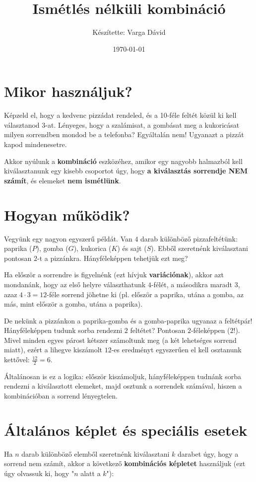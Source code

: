 \documentclass[a4paper,12pt]{article}
\title{\textbf{Ismétlés nélküli kombináció}}
\author{Készítette: Varga Dávid}
\date{\today}
\theoremstyle{definition} %
\begin{document}
\maketitle



\section{Mikor használjuk?}
Képzeld el, hogy a kedvenc pizzádat rendeled, és a 10-féle feltét közül ki kell választanod 3-at. Lényeges, hogy a szalámisat, a gombásat meg a kukoricásat milyen sorrendben mondod be a telefonba? Egyáltalán nem! Ugyanazt a pizzát kapod mindenesetre. 

Akkor nyúlunk a \textbf{kombináció} eszközéhez, amikor egy nagyobb halmazból kell kiválasztanunk egy kisebb csoportot úgy, hogy \textbf{a kiválasztás sorrendje NEM számít}, és elemeket \textbf{nem ismétlünk}. 

\section{Hogyan működik?}
Vegyünk egy nagyon egyszerű példát. Van $4$ darab különböző pizzafeltétünk: paprika ($P$), gomba ($G$), kukorica ($K$) és sajt ($S$). Ebből szeretnénk kiválasztani pontosan $2$-t a pizzánkra. Hányféleképpen tehetjük ezt meg?

Ha először a sorrendre is figyelnénk (ezt hívjuk \textbf{variációnak}), akkor azt mondanánk, hogy az első helyre választhatunk $4$-félét, a másodikra maradt $3$, azaz $4 \cdot 3 = 12$-féle sorrend jöhetne ki (pl. először a paprika, utána a gomba, az más, mint először a gomba, utána a paprika). 

De nekünk a pizzánkon a paprika-gomba és a gomba-paprika ugyanaz a feltétpár! Hányféleképpen tudunk sorba rendezni $2$ feltétet? Pontosan $2$-féleképpen ($2!$). Mivel minden egyes párost kétszer számoltunk meg (a két lehetséges sorrend miatt), ezért a lihegve kiszámolt $12$-es eredményt egyszerűen el kell osztanunk kettővel: $\frac{12}{2} = 6$.

Általánosan is ez a logika: először kiszámoljuk, hányféleképpen tudnánk sorba rendezni a kiválasztott elemeket, majd osztunk a sorrendek számával, hiszen a kombinációban a sorrend lényegtelen.

\section{Általános képlet és speciális esetek}
Ha $n$ darab különböző elemből szeretnénk kiválasztani $k$ darabet úgy, hogy a sorrend nem számít, akkor a következő \textbf{kombinációs képletet} használjuk (ezt úgy olvassuk ki, hogy "$n$ alatt a $k$"):
\end{document}
